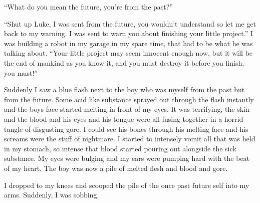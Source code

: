 ``What do you mean the future, you're from the
past?''



``Shut up Luke, I was sent from the future, you wouldn't
understand so let me get back to my warning. I was sent to warn you
about finishing your little project.'' I was building a robot
in my garage in my spare time, that had to be what he was talking
about. ``Your little project may seem innocent enough now, but
it will be the end of mankind as you know it, and you must destroy
it before you finish, you must!''



Suddenly I saw a blue flash next to the boy who was myself from the
past but from the future. Some acid like substance sprayed out
through the flash instantly and the boys face started melting in
front of my eyes. It was terrifying, the skin and the blood and his
eyes and his tongue were all fusing together in a horrid tangle of
disgusting gore. I could see his bones through his melting face and
his screams were the stuff of nightmare. I started to intensely
vomit all that was held in my stomach, so intense that blood
started pouring out alongside the sick substance. My eyes were
bulging and my ears were pumping hard with the beat of my heart.
The boy was now a pile of melted flesh and blood and gore.

I dropped to my knees and scooped the pile of the once past future
self into my arms. Suddenly, I was sobbing. 

 



